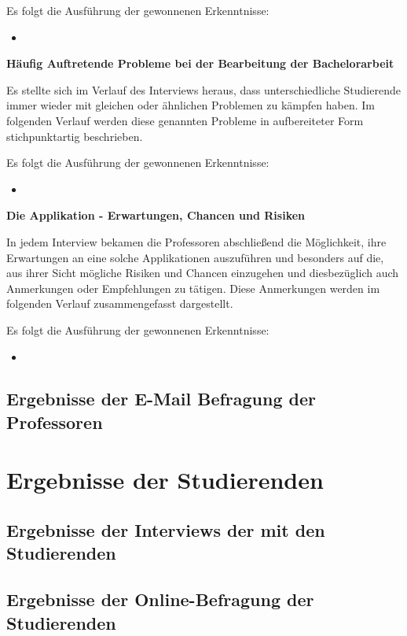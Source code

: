 \documentclass{scrreprt}
\begin{document}
\par Es folgt die Ausführung der gewonnenen Erkenntnisse:
\begin{itemize}
\item 
\end{itemize}

\textbf{Häufig Auftretende Probleme bei der Bearbeitung der Bachelorarbeit}\\
\par Es stellte sich im Verlauf des Interviews heraus, dass unterschiedliche Studierende immer wieder mit gleichen oder ähnlichen Problemen zu kämpfen haben. Im folgenden Verlauf werden diese genannten Probleme in aufbereiteter Form stichpunktartig beschrieben.

\par Es folgt die Ausführung der gewonnenen Erkenntnisse:
\begin{itemize}
\item 
\end{itemize}

\textbf{Die Applikation - Erwartungen, Chancen und Risiken}\\
\par In jedem Interview bekamen die Professoren abschließend die Möglichkeit, ihre Erwartungen an eine solche Applikationen auszuführen und besonders auf die, aus ihrer Sicht mögliche Risiken und Chancen einzugehen und diesbezüglich auch Anmerkungen oder Empfehlungen zu tätigen. Diese Anmerkungen werden im folgenden Verlauf zusammengefasst dargestellt.

\par Es folgt die Ausführung der gewonnenen Erkenntnisse:
\begin{itemize}
\item 
\end{itemize}

\subsection{Ergebnisse der E-Mail Befragung der Professoren}

\section{Ergebnisse der Studierenden}
\subsection{Ergebnisse der Interviews der mit den Studierenden}
\subsection{Ergebnisse der Online-Befragung der Studierenden}
\end{document}
